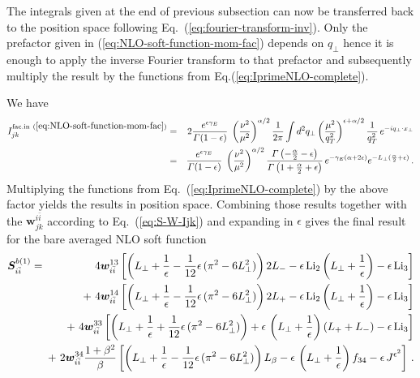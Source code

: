 \documentclass[a4paper,11pt]{report}
\numberwithin{equation}{section}
\newcommand{\Litwo}{{\text{Li}_2}}
\newcommand{\Lithree}{{\text{Li}_3}}
\newcommand{\bfS}{\bm{S}}
\newcommand{\bfw}{\bm{w}}
\newcommand{\wii}[1]{{\bfw_{i\bar i}^{#1}}}
\begin{document}
The integrals given at the end of previous subsection can now be transferred
back to the position space following Eq.~(\ref{eq:fourier-transform-inv}).  Only
the prefactor given in (\ref{eq:NLO-soft-function-mom-fac}) depends on $q_\perp$
hence it is enough to apply the inverse Fourier transform to that prefactor and
subsequently multiply the result by the functions from
Eq.(\ref{eq:IprimeNLO-complete}).

We have
%
\begin{eqnarray}
  I_{jk}^{\text{fac.in}~(\ref{eq:NLO-soft-function-mom-fac})}
  & = &
  2 \frac{e^{\epsilon\gamma_E}}{\Gamma(1-\epsilon)}\;
  \left(\frac{\nu^2}{\mu^2}\right)^{\alpha/2}
  \frac{1}{2\pi}
  \int d^2 q_\perp
  \left(\frac{\mu^2}{q_T^2}\right)^{\epsilon+\alpha/2}
  \frac{1}{q_T^2}\,
  e^{-i q_\perp \cdot x_\perp}
  \nonumber \\
  & = &
  \frac{e^{\epsilon\gamma_E}}{\Gamma(1-\epsilon)}\;
  \left(\frac{\nu^2}{\mu^2}\right)^{\alpha/2}
  \frac{\Gamma\left(-\frac{\alpha}{2}-\epsilon\right)}
       {\Gamma\left(1+\frac{\alpha}{2}+\epsilon\right)}\,
  e^{-\gamma_E (\alpha + 2\epsilon)}
  e^{-L_\perp (\frac{\alpha}{2} + \epsilon)}\,.
\end{eqnarray}
%
Multiplying the functions from Eq.~(\ref{eq:IprimeNLO-complete}) by the above
factor yields the results in position space. Combining those results together
with the $\bfw^{i\bar i}_{jk}$ according to Eq.~(\ref{eq:S-W-Ijk}) and
expanding in $\epsilon$ gives the final result for the bare averaged NLO soft
function
%
\begin{eqnarray}
  \bfS_{i\bar i}^{b(1)} 
  & = & \;\;\,
  4 \wii{13} \left[ 
  \left(L_\perp + \frac{1}{\epsilon} - 
  \frac{1}{12} \epsilon\, (\pi^2- 6 L_\perp^2) \right) 2 L_-
  - \epsilon\, \Litwo \left(L_\perp + \frac{1}{\epsilon}\right)
  - \epsilon\, \Lithree
  \right]
  \nonumber \\
  &  & 
  \hspace{-5pt}
  +\ 4 \wii{14} \left[ 
  \left(L_\perp + \frac{1}{\epsilon} - 
  \frac{1}{12} \epsilon\, (\pi^2- 6 L_\perp^2) \right) 2 L_+
  - \epsilon\, \Litwo \left(L_\perp + \frac{1}{\epsilon}\right)
  - \epsilon\, \Lithree
  \right]
  \label{eq:soft-function-NLO-bare}
  \\
  &  & 
  \hspace{-5pt}
  +\ 4 \wii{33} \left[ 
  \left(L_\perp + \frac{1}{\epsilon} + 
  \frac{1}{12} \epsilon\, (\pi^2- 6 L_\perp^2) \right) 
  + \epsilon\, \left(L_\perp + \frac{1}{\epsilon}\right)(L_+ + L_-)
  - \epsilon\, \Lithree
  \right]
  \nonumber \\
  &  & 
  \hspace{-5pt}
  +\ 2 \wii{34} \frac{1+\beta^2}{\beta} \left[ 
  \left(L_\perp + \frac{1}{\epsilon} - 
  \frac{1}{12} \epsilon\, (\pi^2- 6 L_\perp^2) \right) 
  L_\beta
  - \epsilon\, \left(L_\perp + \frac{1}{\epsilon}\right) f_{34}
  - \epsilon\, J^{\epsilon^2}
  \right]\,.
  \nonumber
\end{eqnarray}
\end{document}
